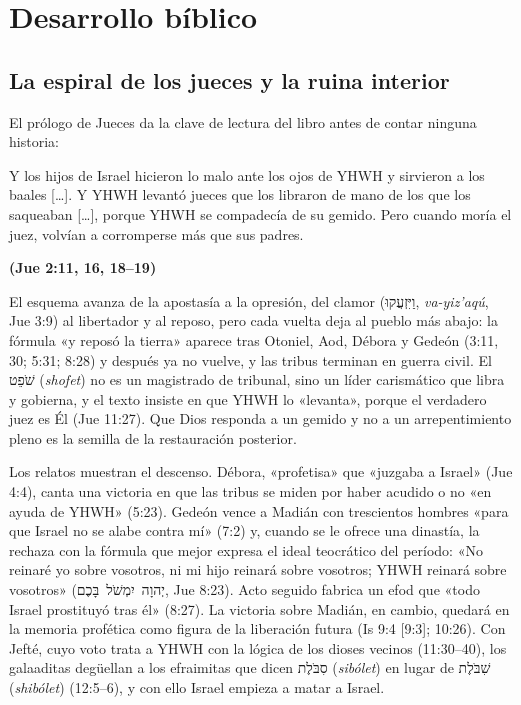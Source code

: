 \documentclass[11pt,letterpaper]{article}
\newcommand{\heb}[1]{\mbox{\foreignlanguage{hebrew}{#1}}}
\newcommand{\fuente}[1]{\par\hfill{\upshape\bfseries\small\textcolor{ladrillo}{#1}}}
\begin{document}
\section{Desarrollo bíblico}

\subsection{La espiral de los jueces y la ruina interior}
El prólogo de Jueces da la clave de lectura del libro antes de contar ninguna historia:

\begin{cita}Y los hijos de Israel hicieron lo malo ante los ojos de YHWH y sirvieron a los baales [\ldots]. Y YHWH levantó jueces que los libraron de mano de los que los saqueaban [\ldots], porque YHWH se compadecía de su gemido. Pero cuando moría el juez, volvían a corromperse más que sus padres.\fuente{(Jue 2:11, 16, 18--19)}\end{cita}

El esquema avanza de la apostasía a la opresión, del clamor (\heb{וַיִּזְעֲקוּ}, \emph{va-yiz'aqú}, Jue 3:9) al libertador y al reposo, pero cada vuelta deja al pueblo más abajo: la fórmula «y reposó la tierra» aparece tras Otoniel, Aod, Débora y Gedeón (3:11, 30; 5:31; 8:28) y después ya no vuelve, y las tribus terminan en guerra civil. El \heb{שֹׁפֵט} (\emph{shofet}) no es un magistrado de tribunal, sino un líder carismático que libra y gobierna, y el texto insiste en que YHWH lo «levanta», porque el verdadero juez es Él (Jue 11:27). Que Dios responda a un gemido y no a un arrepentimiento pleno es la semilla de la restauración posterior.

Los relatos muestran el descenso. Débora, «profetisa» que «juzgaba a Israel» (Jue 4:4), canta una victoria en que las tribus se miden por haber acudido o no «en ayuda de YHWH» (5:23). Gedeón vence a Madián con trescientos hombres «para que Israel no se alabe contra mí» (7:2) y, cuando se le ofrece una dinastía, la rechaza con la fórmula que mejor expresa el ideal teocrático del período: «No reinaré yo sobre vosotros, ni mi hijo reinará sobre vosotros; YHWH reinará sobre vosotros» (\heb{יְהוָה יִמְשֹׁל בָּכֶם}, Jue 8:23). Acto seguido fabrica un efod que «todo Israel prostituyó tras él» (8:27). La victoria sobre Madián, en cambio, quedará en la memoria profética como figura de la liberación futura (Is 9:4 [9:3]; 10:26). Con Jefté, cuyo voto trata a YHWH con la lógica de los dioses vecinos (11:30--40), los galaaditas degüellan a los efraimitas que dicen \heb{סִבֹּלֶת} (\emph{sibólet}) en lugar de \heb{שִׁבֹּלֶת} (\emph{shibólet}) (12:5--6), y con ello Israel empieza a matar a Israel.
\end{document}
